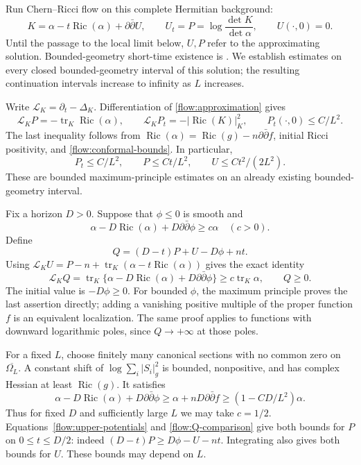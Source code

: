 \documentclass[11pt]{article}
\theoremstyle{definition}
\theoremstyle{remark}
\newcommand{\dd}{\partial\bar\partial}
\DeclareMathOperator{\Ric}{Ric}
\DeclareMathOperator{\tr}{tr}
\numberwithin{equation}{section}
\begin{document}
Run Chern--Ricci flow on this complete Hermitian background:
\begin{equation}\label{flow:approximation}
 K=\alpha-t\Ric(\alpha)+\dd U,\qquad
 U_t=P=\log\frac{\det K}{\det\alpha},\qquad U(\cdot,0)=0.
\end{equation}
Until the passage to the local limit below, $U,P$ refer to the
approximating solution.
Bounded-geometry short-time existence is
\cite[Definition~2.1 and Lemma~2.1]{LeeTam}.  We establish estimates
on every closed bounded-geometry interval of this solution; the
resulting continuation intervals increase to infinity as $L$ increases.

Write $\mathscr L_K=\partial_t-\Delta_K$.
Differentiation of \eqref{flow:approximation} gives
\begin{equation}\label{flow:scalar-evolutions}
 \mathscr L_KP=-\tr_K\Ric(\alpha),\qquad
 \mathscr L_KP_t=-|\Ric(K)|_K^2,
 \qquad P_t(\cdot,0)\le C/L^2.
\end{equation}
The last inequality follows from
$\Ric(\alpha)=\Ric(g)-n\dd f$, initial Ricci positivity, and
\eqref{flow:conformal-bounds}.  In particular,
\begin{equation}\label{flow:upper-potentials}
 P_t\le C/L^2,
 \qquad P\le Ct/L^2,
 \qquad U\le Ct^2/(2L^2).
\end{equation}
These are bounded maximum-principle estimates on an already existing
bounded-geometry interval.

Fix a horizon $D>0$.  Suppose that $\phi\le0$ is smooth and
\begin{equation}\label{flow:phi-condition}
 \alpha-D\Ric(\alpha)+D\dd\phi\ge c\alpha
 \quad(c>0).
\end{equation}
Define
\begin{equation}\label{flow:Q-definition}
 Q=(D-t)P+U-D\phi+nt.
\end{equation}
Using
$\mathscr L_KU=P-n+\tr_K(\alpha-t\Ric(\alpha))$ gives the exact
identity
\begin{equation}\label{flow:Q-comparison}
 \mathscr L_KQ
 =\tr_K\{\alpha-D\Ric(\alpha)+D\dd\phi\}
 \ge c\tr_K\alpha,
 \qquad Q\ge0.
\end{equation}
The initial value is $-D\phi\ge0$.  For bounded $\phi$, the maximum
principle proves the last assertion directly; adding a vanishing
positive multiple of the proper function $f$ is an equivalent
localization.  The same proof applies to functions with downward
logarithmic poles, since $Q\to+\infty$ at those poles.

For a fixed $L$, choose finitely many canonical sections with no common
zero on $\overline{\Omega_L}$.  A constant shift of
$\log\sum_i|S_i|_g^2$ is bounded, nonpositive, and has complex Hessian
at least $\Ric(g)$.  It satisfies
\[
 \alpha-D\Ric(\alpha)+D\dd\phi
 \ge \alpha+nD\dd f\ge(1-CD/L^2)\alpha.
\]
Thus for fixed $D$ and sufficiently large $L$ we may take $c=1/2$.
Equations~\eqref{flow:upper-potentials} and
\eqref{flow:Q-comparison} give both bounds for $P$ on $0\le t\le D/2$:
indeed $(D-t)P\ge D\phi-U-nt$.  Integrating also gives both bounds
for $U$.  These bounds may depend on $L$.
\end{document}

